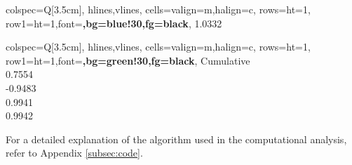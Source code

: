 \documentclass{article}
\begin{document}
\begin{center}
\begin{minipage}[t]{3.5cm}
\begin{tblr}{
				colspec={Q[3.5cm]},
				hlines,vlines,
				cells={valign=m,halign=c},
				rows={ht=1\baselineskip},
				row{1}={ht=1\baselineskip,font=\bfseries,bg=blue!30,fg=black},
			}
			{1.0332} \\ 
		\end{tblr}
	\end{minipage}
	\hspace{1em}
	\begin{minipage}[t]{3.5cm}
		\centering
		\begin{tblr}{
				colspec={Q[3.5cm]},
				hlines,vlines,
				cells={valign=m,halign=c},
				rows={ht=1\baselineskip},
				row{1}={ht=1\baselineskip,font=\bfseries,bg=green!30,fg=black},
			}
			Cumulative \\
			{0.7554} \\
			{-0.9483} \\
			{0.9941} \\
			{0.9942} \\
		\end{tblr}
	\end{minipage}
\end{center}
\label{Consistent Gradient Values Across Units}
\vspace{0.5em}
For a detailed explanation of the algorithm used in the computational analysis, refer to Appendix \ref{subsec:code}.



	\newpage\restoregeometry
	
\end{document}

